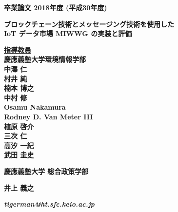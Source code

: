 \pagestyle{empty}

\begin{center}

\vspace{5cm}

\textbf{\Large 卒業論文 2018年度 (平成30年度)}

\vspace{2cm}

\textbf{\LARGE ブロックチェーン技術とメッセージング技術を使用した \\ IoT データ市場 MIWWG の実装と評価}

\vspace{3cm}

\textbf{\underline{\large 指導教員}}\\
\textbf{慶應義塾大学環境情報学部}\\
\vspace{0.5cm}
\textbf{\Large 中澤 仁}\\
\textbf{\Large 村井 純}\\
\textbf{\Large 楠本 博之}\\
\textbf{\Large 中村 修}\\
\textbf{\Large Osamu Nakamura}\\
\textbf{\Large Rodney D. Van Meter III}\\
\textbf{\Large 植原 啓介}\\
\textbf{\Large 三次 仁}\\
\textbf{\Large 高汐 一紀}\\
\textbf{\Large 武田 圭史}\\

\vspace{5cm}

\textbf{\LARGE 慶應義塾大学 \LARGE 総合政策学部}

\vspace{.5em}

\textbf{\LARGE 井上 義之}

\vspace{.3em}

\textbf{\it tigerman@ht.sfc.keio.ac.jp}



\newpage

\end{center}

\pagestyle{plain}
